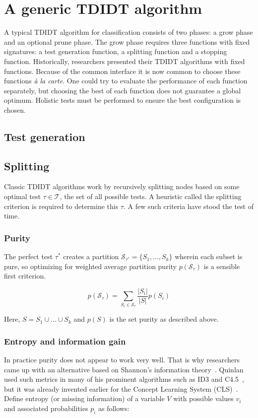 \section{A generic TDIDT algorithm}
A typical TDIDT algorithm for classification consists of two phases: a grow phase and an optional prune phase. The grow phase requires three functions with fixed signatures: a test generation function, a splitting function and a stopping function. Historically, researchers presented their TDIDT algorithms with fixed functions. Because of the common interface it is now common to choose these functions \emph{\`{a} la carte}. One could try to evaluate the performance of each function separately, but choosing the best of each function does not guarantee a global optimum. Holistic tests must be performed to ensure the best configuration is chosen.

\subsection{Test generation}

\subsection{Splitting}
Classic TDIDT algorithms work by recursively splitting nodes based on some optimal test $\tau \in \mathcal{T}$, the set of all possible tests. A heuristic called the splitting criterion is required to determine this $\tau$. A few such criteria have stood the test of time.

\subsubsection{Purity}
The perfect test $\tau^*$ creates a partition $\mathcal{S}_{\tau^*} = \{S_1, \ldots, S_k\}$ wherein each subset is pure, so optimizing for weighted average partition purity $p(\mathcal{S}_\tau)$ is a sensible first criterion.

\begin{equation}
    p(\mathcal{S}_\tau) = \sum_{S_i \in \mathcal{S}_\tau} \frac{|S_i|}{|S|} p(S_i)
\end{equation}

Here, $S = S_1 \cup \ldots \cup S_k$ and $p(S)$ is the set purity as described above.

\subsubsection{Entropy and information gain}
In practice purity does not appear to work very well. That is why researchers came up with an alternative based on Shannon's information theory~\cite{shannon1948mathematical}. Quinlan used such metrics in many of his prominent algorithms such as ID3 and C4.5~\cite{id3ter, c45}, but it was already invented earlier for the Concept Learning System (CLS)~\cite{cls}. Define entropy (or missing information) of a variable $V$ with possible values $v_i$ and associated probabilities $p_i$ as follows:

